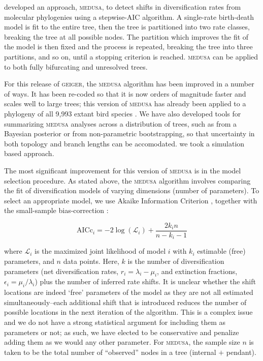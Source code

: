 \citet{Alfaro2009} developed an approach, \textsc{medusa}, to detect shifts in diversification rates from molecular phylogenies using a stepwise-AIC algorithm. A single-rate birth-death model is fit to the entire tree, then the tree is partitioned into two rate classes, breaking the tree at all possible nodes. The partition which improves the fit of the model is then fixed and the process is repeated, breaking the tree into three partitions, and so on, until a stopping criterion is reached. \textsc{medusa} can be applied to both fully bifurcating and unresolved trees. 

For this release of \textsc{geiger}, the \textsc{medusa} algorithm has been improved in a number of ways. It has been re-coded so that it is now orders of magnitude faster and scales well to large trees; this version of \textsc{medusa} has already been applied to a phylogeny of all 9,993 extant bird species \citep{Jetz2012}. We have also developed tools for summarizing \textsc{medusa} analyses across a distribution of trees, such as from a Bayesian posterior or from non-parametric bootstrapping, so that uncertainty in both topology and branch lengths can be accomodated. we took a simulation based approach. 

The most significant improvement for this version of \textsc{medusa} is in the model selection procedure. As stated above, the \textsc{medusa} algorithm involves comparing the fit of diversification models of varying dimensions (number of parameters). To select an appropriate model, we use Akaike Information Criterion \citep[AIC;][]{Akaike1974}, together with the small-sample bias-correction \citep[AICc;][]{BA2004}:

\begin{equation}
\mathrm{AICc}_{i} = -2 \log (\mathcal{L}_{i}) +
	\frac{2k_{i}n}{n-k_{i}-1}
\end{equation}

where $\mathcal{L}_{i}$ is the maximized joint likelihood of model $i$ with $k_{i}$ estimable (free) parameters, and $n$ data points. Here, $k$ is the number of diversification parameters (net diversification rates, $r_{i} = \lambda_{i} - \mu_{i}$, and extinction fractions, $\epsilon_{i} = \mu_{i}/\lambda_{i}$) plus the number of inferred rate shifts. It is unclear whether the shift locations are indeed `free' parameters of the model as they are not all estimated simultaneously--each additional shift that is introduced reduces the number of possible locations in the next iteration of the algorithm. This is a complex issue and we do not have a strong statistical argument for including them as parameters or not; as such, we have elected to be conservative and penalize adding them as we would any other parameter. For \textsc{medusa}, the sample size $n$ is taken to be the total number of ``observed'' nodes in a tree (internal $+$ pendant). 

